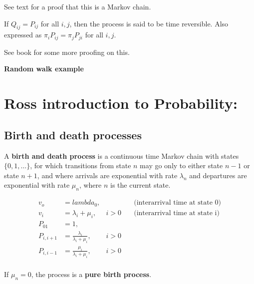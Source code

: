 \documentclass{article}
\begin{document}
See text for a proof that this is a Markov chain.

If $Q_{ij} = P_{ij}$ for all $i,j$, then the process is said to be
time reversible. Also expressed as $\pi_i P_{ij} = \pi_j P_{ji}$
for all $i,j$.

See book for some more proofing on this.

\textbf{Random walk example}



\subsection{}
\subsection{}

\setcounter{section}{5}
\section{Ross introduction to Probability:}
\setcounter{subsection}{2}
\subsection{Birth and death processes}
\setcounter{subsection}{4}

\begin{definition}
    A \textbf{birth and death process} is a continuous time Markov chain
    with states $\{0,1,\ldots\}$, for which transitions from state $n$
    may go only to either state $n-1$ or state $n+1$, and where arrivals
    are exponential with rate $\lambda_n$ and departures are exponential
    with rate $\mu_n$, where $n$ is the current state.
\end{definition}

\begin{align*}
    v_o &= lambda_0, &&\quad\text{(interarrival time at state 0)}\\
    v_i &= \lambda_i + \mu_i, & i > 0 &\quad\text{(interarrival time at state
    i)}\\
    P_{01} &= 1,\\
    P_{i,i+1} &= \frac{\lambda_i}{\lambda_i + \mu_i}, & i > 0\\
    P_{i,i-1} &= \frac{\mu_i}{\lambda_i + \mu_i}, & i > 0\\
\end{align*}

If $\mu_n = 0$, the process is a \textbf{pure birth process}.
\end{document}
